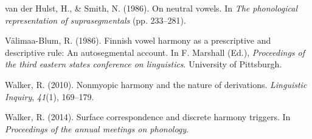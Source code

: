 \documentclass[,doc,floatsintext]{apa6}
\theoremstyle{definition}
\theoremstyle{definition}
\theoremstyle{definition}
\theoremstyle{remark}
\begin{document}
\hypertarget{ref-vdHulstSmith1986}{}
van der Hulst, H., \& Smith, N. (1986). On neutral vowels. In \emph{The
phonological representation of suprasegmentals} (pp. 233--281).

\hypertarget{ref-valimaablum1986}{}
Välimaa-Blum, R. (1986). Finnish vowel harmony as a prescriptive and
descriptive rule: An autosegmental account. In F. Marshall (Ed.),
\emph{Proceedings of the third eastern states conference on
linguistics}. University of Pittsburgh.

\hypertarget{ref-walker2010}{}
Walker, R. (2010). Nonmyopic harmony and the nature of derivations.
\emph{Linguistic Inquiry}, \emph{41}(1), 169--179.

\hypertarget{ref-walker2014}{}
Walker, R. (2014). Surface correspondence and discrete harmony triggers.
In \emph{Proceedings of the annual meetings on phonology}.
\end{document}
